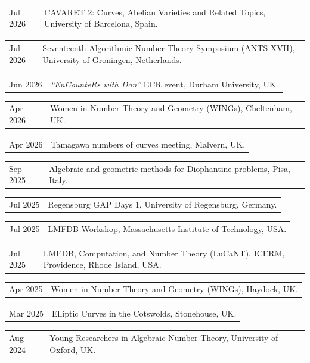 \documentclass[a4paper,11pt]{article}
\makeatletter
\newcommand{\datedentry}[2]{%
  \begin{tabularx}{\textwidth}{
    @{}>{\raggedleft\arraybackslash}p{2.25cm}
    @{\hspace{0.45cm}}X@{}}
    #1 & #2
  \end{tabularx}\par\vspace{0.5pt}
}
\newcommand{\conference}[3]{%
  \datedentry{#1}{#2, #3.}
  \vspace{1pt}
}
\makeatother
\begin{document}
\conference{Jul 2026}
  {CAVARET 2: Curves, Abelian Varieties and Related Topics}
  {University of Barcelona, Spain}

\conference{Jul 2026}
  {Seventeenth Algorithmic Number Theory Symposium (ANTS XVII)}
  {University of Groningen, Netherlands}

\conference{Jun 2026}
  {\textit{``EnCounteRs with Don''} ECR event}
  {Durham University, UK}

\conference{Apr 2026}
  {Women in Number Theory and Geometry (WINGs)}
  {Cheltenham, UK}

\conference{Apr 2026}
  {Tamagawa numbers of curves meeting}
  {Malvern, UK}

\conference{Sep 2025}
  {Algebraic and geometric methods for Diophantine problems}
  {Pisa, Italy}

\conference{Jul 2025}
  {Regensburg GAP Days 1}
  {University of Regensburg, Germany}

\conference{Jul 2025}
  {LMFDB Workshop}
  {Massachusetts Institute of Technology, USA}

\conference{Jul 2025}
  {LMFDB, Computation, and Number Theory (LuCaNT)}
  {ICERM, Providence, Rhode Island, USA}

\conference{Apr 2025}
  {Women in Number Theory and Geometry (WINGs)}
  {Haydock, UK}

\conference{Mar 2025}
  {Elliptic Curves in the Cotswolds}
  {Stonehouse, UK}

\conference{Aug 2024}
  {Young Researchers in Algebraic Number Theory}
  {University of Oxford, UK}

%
\end{document}
